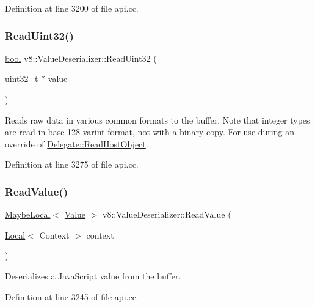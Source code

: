 Definition at line 3200 of file api.\+cc.

\mbox{\label{classv8_1_1ValueDeserializer_a766073df20a4e460738874f684d9169f}} 
\subsubsection{\texorpdfstring{Read\+Uint32()}{ReadUint32()}}
{\footnotesize\ttfamily \mbox{\hyperlink{classbool}{bool}} v8\+::\+Value\+Deserializer\+::\+Read\+Uint32 (\begin{DoxyParamCaption}\item[{\mbox{\hyperlink{classuint32__t}{uint32\+\_\+t}} $\ast$}]{value }\end{DoxyParamCaption})}

Reads raw data in various common formats to the buffer. Note that integer types are read in base-\/128 varint format, not with a binary copy. For use during an override of \mbox{\hyperlink{classv8_1_1ValueDeserializer_1_1Delegate_a705e325895f76f6cac213b89b505f960}{Delegate\+::\+Read\+Host\+Object}}. 

Definition at line 3275 of file api.\+cc.

\mbox{\label{classv8_1_1ValueDeserializer_aa8b6efe5d8e47a2160b2b4e30ab3faa4}} 
\subsubsection{\texorpdfstring{Read\+Value()}{ReadValue()}}
{\footnotesize\ttfamily \mbox{\hyperlink{classv8_1_1MaybeLocal}{Maybe\+Local}}$<$ \mbox{\hyperlink{classv8_1_1Value}{Value}} $>$ v8\+::\+Value\+Deserializer\+::\+Read\+Value (\begin{DoxyParamCaption}\item[{\mbox{\hyperlink{classv8_1_1Local}{Local}}$<$ Context $>$}]{context }\end{DoxyParamCaption})}

Deserializes a Java\+Script value from the buffer. 

Definition at line 3245 of file api.\+cc.

